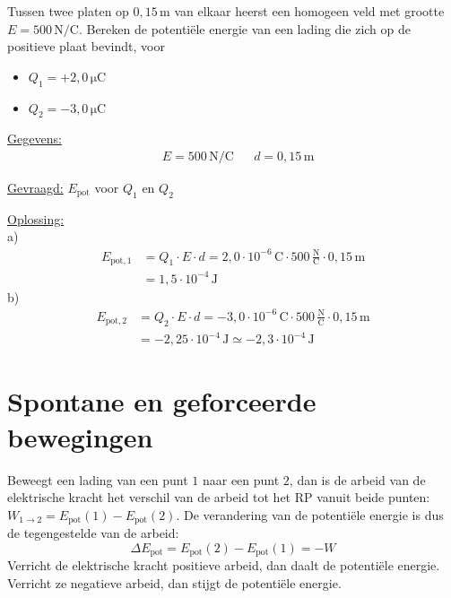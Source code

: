 \documentclass{ximera}
\begin{document}
\begin{example}[foldable=true,title={Voorbeeld: teken van de potentiële energie}]\nl
Tussen twee platen op $0{,}15 \, \mathrm{m}$ van elkaar heerst een homogeen veld met grootte $E = 500 \, \mathrm{N/C}$. Bereken de potentiële energie van een lading die zich op de positieve plaat bevindt, voor
\begin{itemize}
    \item[a)] $Q_{1} = +2{,}0 \, \mathrm{\mu C}$
    \item[b)] $Q_{2} = -3{,}0 \, \mathrm{\mu C}$
\end{itemize}

\begin{solution}\nl
\underline{Gegevens:}
\begin{align*}
    & E = 500 \, \mathrm{N/C} & & d = 0{,}15 \, \mathrm{m}
\end{align*}

\underline{Gevraagd:} $E_{\text{pot}}$ voor $Q_1$ en $Q_2$

\underline{Oplossing:}\\
a) \begin{align*}
    E_{\text{pot},1} &= Q_{1} \cdot E \cdot d = 2{,}0 \cdot 10^{-6} \, \mathrm{C} \cdot 500 \, \frac{\mathrm{N}}{\mathrm{C}} \cdot 0{,}15 \, \mathrm{m} \\
    &= \boxed{1{,}5 \cdot 10^{-4} \, \mathrm{J}}
\end{align*}
b) \begin{align*}
    E_{\text{pot},2} &= Q_{2} \cdot E \cdot d = -3{,}0 \cdot 10^{-6} \, \mathrm{C} \cdot 500 \, \frac{\mathrm{N}}{\mathrm{C}} \cdot 0{,}15 \, \mathrm{m} \\
    &= -2{,}25 \cdot 10^{-4} \, \mathrm{J}\simeq \boxed{-2{,}3 \cdot 10^{-4} \, \mathrm{J}}
\end{align*}
\end{solution}
\end{example}

\section{Spontane en geforceerde bewegingen}
Beweegt een lading van een punt $1$ naar een punt $2$, dan is de arbeid van de elektrische kracht het verschil van de arbeid tot het RP vanuit beide punten: $W_{1 \to 2} = E_{\text{pot}}(1) - E_{\text{pot}}(2)$. De verandering van de potentiële energie is dus de tegengestelde van de arbeid:
\[
    \Delta E_{\text{pot}} = E_{\text{pot}}(2) - E_{\text{pot}}(1) = -W
\]
Verricht de elektrische kracht positieve arbeid, dan daalt de potentiële energie. Verricht ze negatieve arbeid, dan stijgt de potentiële energie.
\end{document}
